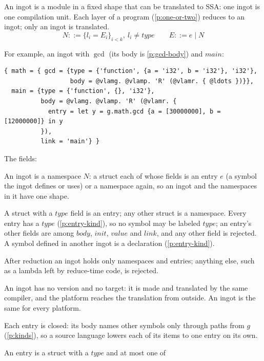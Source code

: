 \documentclass[11pt,letterpaper]{article}
\newcommand{\pref}[1]{\ref{#1}}  %
\begin{document}
\begin{points}
\item\label{p:module} An ingot is a module in a fixed shape that can be translated to SSA: one ingot is one
  compilation unit. Each layer of a program (\pref{p:one-or-two}) reduces to an ingot; only an ingot is translated.
  \[N ::= \{l_i = E_i\}_{i<k},\ l_i \ne \mathit{type} \qquad E ::= e \mid N\]
\item\label{p:gcd} For example, an ingot with $\gcd$ (its body is \pref{p:gcd-body}) and $\mathit{main}$:
  \begin{Verbatim}[commandchars=\@\<\>, xleftmargin=2em]
{ math = { gcd = {type = {'function', {a = 'i32', b = 'i32'}, 'i32'},
                  body = @vlamg. @vlamp. 'R' (@vlamr. { @ldots })}},
  main = {type = {'function', {}, 'i32'},
          body = @vlamg. @vlamp. 'R' (@vlamr. {
            entry = let y = g.math.gcd {a = [30000000], b = [12000000]} in y
          }),
          link = 'main'} }
\end{Verbatim}
\item The fields:
  \begin{subpoints}
  \item An ingot is a namespace $N$: a struct each of whose fields is an
    entry $e$ (a symbol the ingot defines or uses) or a namespace again, so an ingot and the namespaces in
    it have one shape.
  \item A struct with a $\mathit{type}$ field is an entry; any other struct is a namespace. Every entry has a
    $\mathit{type}$ (\pref{p:entry-kind}), so no symbol may be labeled $\mathit{type}$; an entry's other fields are
    among $\mathit{body}$, $\mathit{init}$, $\mathit{value}$ and $\mathit{link}$, and any other field is rejected. A symbol
    defined in another ingot is a declaration (\pref{p:entry-kind}).
  \item After reduction an ingot holds only namespaces and entries; anything else, such as a lambda left
    by reduce-time code, is rejected.
  \item An ingot has no version and no target: it is made and translated by the same compiler, and
    the platform reaches the translation from outside. An ingot is the same for every platform.
  \item Each entry is closed: its body names other symbols only through paths from $g$ (\pref{p:kinds}), so a source
    language lowers each of its items to one entry on its own.
  \end{subpoints}
\item\label{p:entry-kind} An entry is a struct with a $\mathit{type}$ and at most one of

\end{points}
\end{document}
